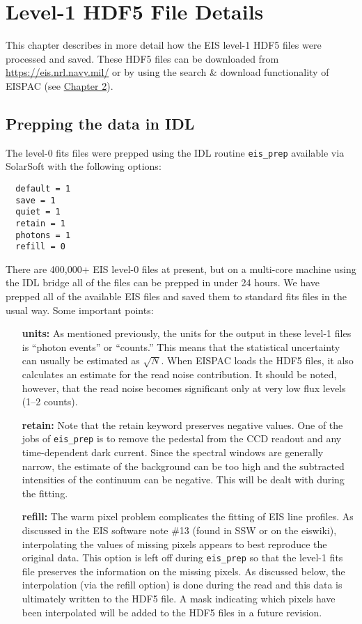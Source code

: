
\chapter{Level-1 HDF5 File Details}
\label{sec:prep}

This chapter describes in more detail how the EIS level-1 HDF5 files were processed and saved. These HDF5 files can be downloaded from \url{https://eis.nrl.navy.mil/} or by using the search \& download functionality of EISPAC (see \hyperref[sec:download]{Chapter 2}).

\section{Prepping the data in IDL}
The level-0 fits files were prepped using the IDL routine \verb+eis_prep+ available via SolarSoft
\citep{Freeland:1998} with the following options:
\begin{verbatim}
  default = 1
  save = 1
  quiet = 1
  retain = 1
  photons = 1
  refill = 0
\end{verbatim}
There are 400,000+ EIS level-0 files at present, but on a multi-core machine using the IDL bridge
all of the files can be prepped in under 24 hours. We have prepped all of the available EIS files
and saved them to standard fits files in the usual way. Some important points:

\begin{enumerate}
\item[\bf units:] As mentioned previously, the units for the output in these level-1 files is
  ``photon events'' or ``counts.''  This means that the statistical uncertainty can usually be
  estimated as $\sqrt{N}$. When EISPAC loads the HDF5 files, it also calculates an estimate for
  the read noise contribution. It should be noted, however, that the read noise becomes
  significant only at very low flux levels (1--2 counts).

\item[\bf retain:] Note that the retain keyword preserves negative values. One of the jobs of
  \verb+eis_prep+ is to remove the pedestal from the CCD readout and any time-dependent dark
  current. Since the spectral windows are generally narrow, the estimate of the background can be
  too high and the subtracted intensities of the continuum can be negative. This will be dealt with
  during the fitting.

\item[\bf refill:] The warm pixel problem complicates the fitting of EIS line profiles. As
  discussed in the EIS software note \#13 (found in SSW or on the eiswiki), interpolating the values
  of missing pixels appears to best reproduce the original data. This option is left off during
  \verb+eis_prep+ so that the level-1 fits file preserves the information on the missing pixels. As
  discussed below, the interpolation (via the refill option) is done during the read and this data is
  ultimately written to the HDF5 file. A mask indicating which pixels have been interpolated will be
  added to the HDF5 files in a future revision.
\end{enumerate}

